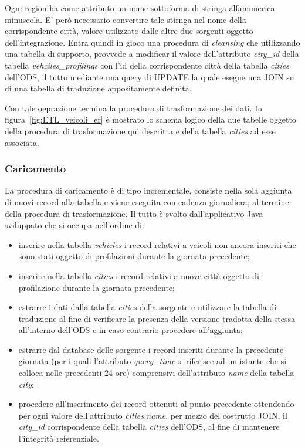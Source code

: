Ogni region ha come attributo un nome sottoforma di stringa alfanumerica
minuscola. E' però necessario convertire tale stirnga nel nome
della corrispondente città, valore utilizzato dalle altre due sorgenti
oggetto dell'integrazione. Entra quindi in gioco una procedura di
\textit{cleansing} che utilizzando una tabella di supporto, provvede a
modificar il valore dell'attributo \textit{city\_id} della tabella
\textit{vehciles\_profilings} con l'id della corrispondente città della
tabella \textit{cities} dell'ODS, il tutto mediante una query di UPDATE
la quale esegue una JOIN su di una tabella di traduzione appositamente
definita.

Con tale oeprazione termina la procedura di trasformazione dei dati.
In figura~\ref{fig:ETL_veicoli_er} è mostrato lo schema logico della due tabelle
oggetto della procedura di trasformazione qui descritta e della tabella
\textit{cities} ad esse associata.

\subsubsection{Caricamento}

La procedura di caricamento è di tipo incrementale, consiste nella sola aggiunta di
nuovi record alla tabella e viene eseguita con cadenza giornaliera, al termine della
procedura di trasformazione. Il tutto è svolto dall'applicativo Java sviluppato che
si occupa nell'ordine di:
\begin{itemize}
\item inserire nella tabella \textit{vehicles} i record relativi a veicoli non ancora
inseriti che sono stati oggetto di profilazioni durante la giornata precedente;
\item inserire nella tabella \textit{cities} i record relativi a nuove città oggetto
di profilazione durante la giornata precedente;
\item estrarre i dati dalla tabella \textit{cities} della sorgente e utilizzare la
tabella di traduzione al fine di verificare la presenza della versione tradotta della
stessa all'interno dell'ODS e in caso contrario procedere all'aggiunta;
\item estrarre dal database delle sorgente i record inseriti durante la precedente
giornata (per i quali l'attributo \textit{query\_time} si riferisce ad un istante che
si colloca nelle precedenti 24 ore) comprensivi dell'attributo \textit{name} della
tabella \textit{city};
\item procedere all'inserimento dei record ottenuti al punto precedente ottendendo
per ogni valore dell'attributo \textit{cities.name}, per mezzo del costrutto JOIN,
il \textit{city\_id} corrispondente della tabella \textit{cities} dell'ODS, al fine
di mantenere l'integrità referenziale.
\end{itemize}

